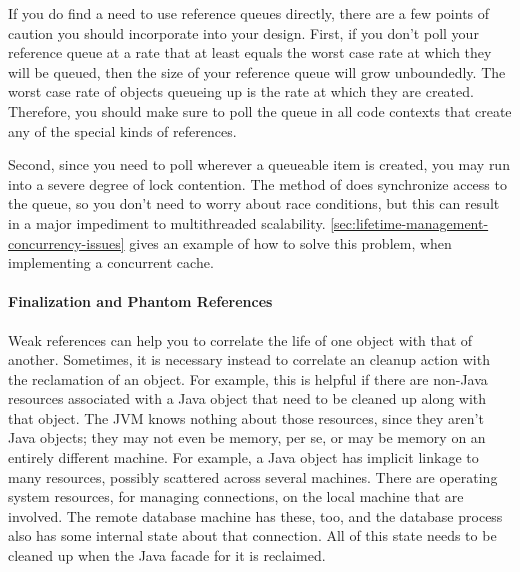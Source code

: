 If you do find a need to use reference queues directly, there are a few points
of caution you should incorporate into your design. First,
if you don't poll your reference queue at a rate that at least equals the worst
case rate at which they will be queued, then the size of your reference queue
will grow unboundedly. The worst case rate of objects queueing up is the rate at
which they are created. Therefore, you should make sure to poll the queue in all
code contexts that create any of the special kinds of references.


Second, since you need to poll wherever a queueable item is created, you may run
into a severe degree of lock contention. The  method of
 does synchronize access to the queue, so you don't need
to worry about race conditions, but this can result in a major impediment to
multithreaded scalability. \autoref{sec:lifetime-management-concurrency-issues}
gives an example of how to solve this problem, when implementing a concurrent
cache.


\paragraph{Finalization and Phantom References}

Weak references can help you to correlate the life of one object with that of
another. Sometimes, it is necessary instead to correlate an cleanup action with
the reclamation of an object. For example, this is helpful if there are non-Java
resources associated with a Java object that need to be cleaned up along with
that object. The JVM knows nothing about those resources, since they aren't Java
objects; they may not even be memory, per se, or may be memory on an entirely
different machine. For example, a Java  object has
implicit linkage to many resources, possibly scattered across several machines.
There are operating system resources, for managing connections, on the local
machine that are involved. The remote database machine has these, too, and the
database process also has some internal state about that connection. All of this
state needs to be cleaned up when the Java facade for it is reclaimed.

